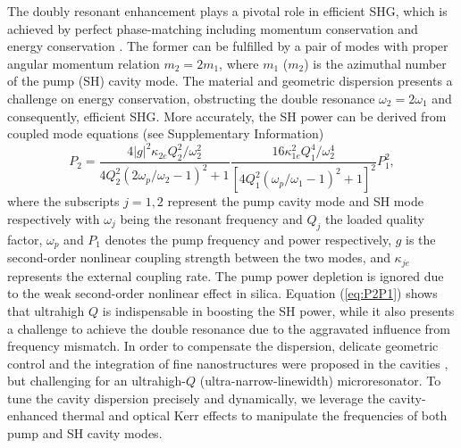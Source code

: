 \documentclass[a4paper,8pt,hyperref, twocolumn, aps, prl]{article}
\begin{document}
The doubly resonant enhancement plays a pivotal role in efficient SHG, which is achieved by perfect phase-matching including momentum conservation and energy conservation \cite{boyd2003nonlinear}.
The former can be fulfilled by a pair of modes with proper angular momentum relation $m_2=2m_1$, where $m_1$ ($m_2$) is the azimuthal number of the pump (SH) cavity mode. 
The material and geometric dispersion presents a challenge on energy conservation, obstructing the double resonance $\omega_2=2\omega_1$ and consequently, efficient SHG. 
More accurately, the SH power can be derived from coupled mode equations (see Supplementary Information)
\begin{equation}
P_2 = \frac{4|g|^2\kappa_{2e}Q_2^2/\omega_2^2}{4Q_2^2(2\omega_p/\omega_2-1)^2+1}\frac{16\kappa_{1e}^2Q_1^4/\omega_2^4}{[4Q_1^2(\omega_p/\omega_1-1)^2+1]^2}P_1^2,
\label{eq:P2P1}
\end{equation}
where the subscripts $j=1, 2$  represent the pump cavity mode and SH mode respectively with $\omega_j$ being the resonant frequency and $Q_j$ the loaded quality factor, $\omega_p$ and $P_1$ denotes the pump frequency and power respectively, $g$ is the second-order nonlinear coupling strength between the two modes, and $\kappa_{je}$ represents the external coupling rate. The pump power depletion is ignored due to the weak second-order nonlinear effect in silica.
Equation (\ref{eq:P2P1}) shows that ultrahigh $Q$ is indispensable in boosting the SH power, while it also presents a challenge to achieve the double resonance due to the aggravated influence from frequency mismatch. 
In order to compensate the dispersion, delicate geometric control and the integration of fine nanostructures were proposed in the cavities \cite{levy2011harmonic, kozyreff2008whispering, xu2008second, dominguez2011whispering}, but challenging for an ultrahigh-$Q$ (ultra-narrow-linewidth) microresonator.  
To tune the cavity dispersion precisely and dynamically, we leverage the cavity-enhanced thermal and optical Kerr effects to manipulate the frequencies of both pump and SH cavity modes. 
\end{document}
